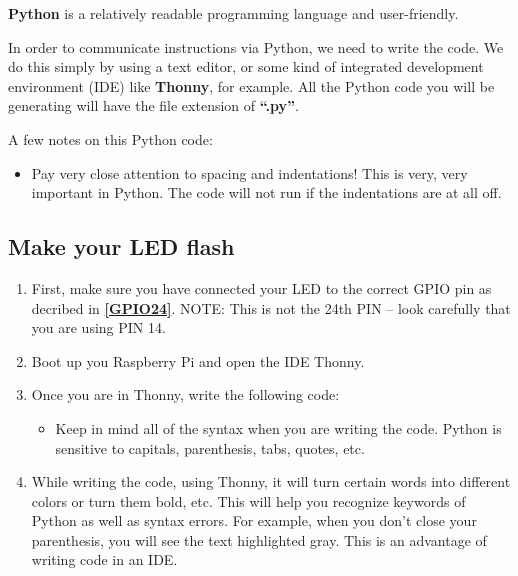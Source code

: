 \documentclass{article}\usepackage[]{graphicx}\usepackage[]{color}
\begin{document}
\textbf{Python} is a relatively readable programming language and user-friendly. 

In order to communicate instructions via Python, we need to write the code. We do this simply by using a text editor, or some kind of integrated development environment (IDE) like \textbf{Thonny}, for example. All the Python code you will be generating will have the file extension of \textbf{``.py''}.

A few notes on this Python code:

\begin{itemize}
\item Pay very close attention to spacing and indentations! This is very, very important in Python.  The code will not run if the indentations are at all off.
\end{itemize}

\subsection{Make your LED flash}

\begin{enumerate}
\item First, make sure you have connected your LED to the correct GPIO pin as decribed in \textbf{\ref{GPIO24}}. NOTE: This is not the 24th PIN -- look carefully that you are using PIN 14.
\item Boot up you Raspberry Pi and open the IDE Thonny.
\item Once you are in Thonny, write the following code: \newline

\begin{itemize}
\item Keep in mind all of the syntax when you are writing the code. Python is sensitive to capitals, parenthesis, tabs, quotes, etc.
\end{itemize}
\item While writing the code, using Thonny, it will turn certain words into different colors or turn them bold, etc. This will help you recognize keywords of Python as well as syntax errors. For example, when you don't close your parenthesis, you will see the text highlighted gray. This is an advantage of writing code in an IDE.
\end{enumerate}
\end{document}
